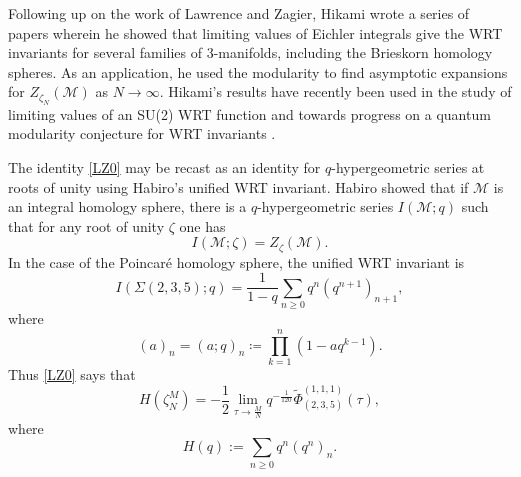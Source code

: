 \documentclass[11pt,reqno]{amsart}
\theoremstyle{definition}
\numberwithin{equation}{section}
\renewcommand{\=}{\;=\;}
\begin{document}
Following up on the work of Lawrence and Zagier, Hikami wrote a series of papers \cite{hikami1, hikami2, hikami3, hikami4} wherein he showed that limiting values of Eichler integrals give the WRT invariants for several families of $3$-manifolds, including the Brieskorn homology spheres.  As an application, he used the modularity to find asymptotic expansions for $Z_{\zeta_N}(\mathcal{M})$ as $N \to \infty$.  Hikami's results have recently been used in the study of limiting values of an SU(2) WRT function \cite{am, ahlmss, fimt} and towards progress on a quantum modularity conjecture for WRT invariants \cite[Theorem 1]{ps}. 

The identity \eqref{LZ0} may be recast as an identity for $q$-hypergeometric series at roots of unity using Habiro's unified WRT invariant.  Habiro \cite{Habiro} showed that if $\mathcal{M}$ is an integral homology sphere, there is a $q$-hypergeometric series $I(\mathcal{M};q)$ such that for any root of unity $\zeta$ one has
\begin{equation*}
I(\mathcal{M};\zeta) = Z_{\zeta}(\mathcal{M}).
\end{equation*}   
In the case of the Poincar\'e homology sphere, the unified WRT invariant is \cite{TTQLe}
\begin{equation*}
I(\Sigma(2,3,5);q) = \frac{1}{1-q}\sum_{n \geq 0} q^n(q^{n+1})_{n+1},
\end{equation*}    
where 
\begin{equation*}
(a)_n = (a;q)_n \coloneqq \prod_{k=1}^{n} (1-aq^{k-1}).
\end{equation*}
Thus \eqref{LZ0} says that
\begin{equation} \label{LZ}
H(\zeta_N^M) = -\frac{1}{2} \lim_{\tau \to \frac{M}{N}} q^{-\frac{1}{120}} \widetilde{\Phi}_{(2,3,5)}^{(1,1,1)} (\tau),
\end{equation}
where 
\begin{equation*} \label{Hbase}	
H(q) := \sum_{n \geq 0} q^n (q^n)_n.
\end{equation*}
\end{document}
